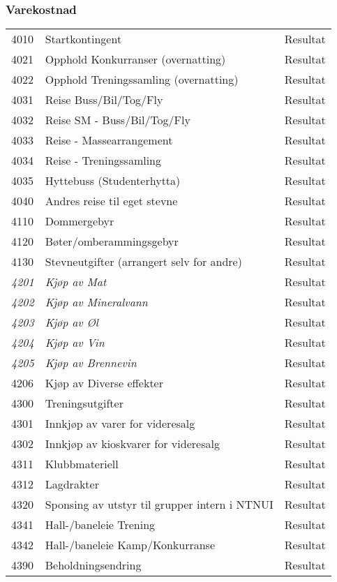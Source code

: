 \subsubsection*{Varekostnad}
\begin{table}[H]
	\begin{tabular}{l l l }
4010 & Startkontingent & Resultat\\
4021 & Opphold Konkurranser (overnatting) & Resultat\\
4022 & Opphold Treningssamling (overnatting) & Resultat\\
4031 & Reise Buss/Bil/Tog/Fly & Resultat\\
4032 & Reise SM - Buss/Bil/Tog/Fly & Resultat\\
4033 & Reise -  Massearrangement & Resultat\\
4034 & Reise - Treningssamling & Resultat\\
4035 & Hyttebuss (Studenterhytta) & Resultat\\
4040 & Andres reise til eget stevne & Resultat\\
4110 & Dommergebyr & Resultat\\
4120 & Bøter/omberammingsgebyr & Resultat\\
4130 & Stevneutgifter (arrangert selv for andre) & Resultat\\
\emph{4201} & \emph{Kjøp av Mat} & Resultat\\
\emph{4202} & \emph{Kjøp av Mineralvann} & Resultat\\
\emph{4203} & \emph{Kjøp av Øl} & Resultat\\
\emph{4204} & \emph{Kjøp av Vin} & Resultat\\
\emph{4205} & \emph{Kjøp av Brennevin} & Resultat\\
4206 & Kjøp av Diverse effekter & Resultat\\
4300 & Treningsutgifter & Resultat\\
4301 & Innkjøp av varer for videresalg & Resultat\\
4302 & Innkjøp av kioskvarer for videresalg & Resultat\\
4311 & Klubbmateriell & Resultat\\
4312 & Lagdrakter & Resultat\\
4320 & Sponsing av utstyr til grupper intern i NTNUI & Resultat\\
4341 & Hall-/baneleie Trening & Resultat\\
4342 & Hall-/baneleie Kamp/Konkurranse & Resultat\\
4390 & Beholdningsendring & Resultat\\

\end{tabular}
\end{table}
